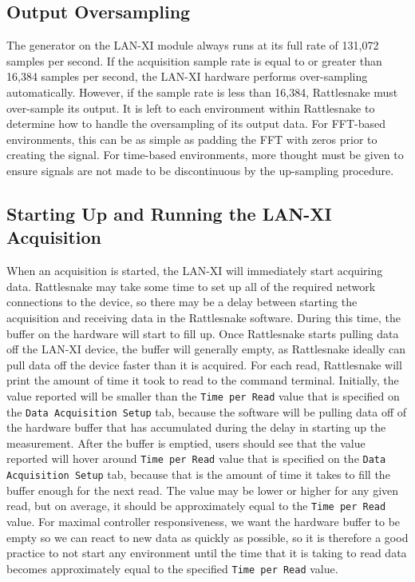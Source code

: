 \documentclass[pdf,12pt,report]{SANDreport}
\newcommand{\inlineCode}{\lstinline[basicstyle=\bfseries\ttfamily]}
\begin{document}
    \subsection{Output Oversampling}
    The generator on the LAN-XI module always runs at its full rate of 131,072 samples per second.  If the acquisition sample rate is equal to or greater than 16,384 samples per second, the LAN-XI hardware performs over-sampling automatically.  However, if the sample rate is less than 16,384, Rattlesnake must over-sample its output.  It is left to each environment within Rattlesnake to determine how to handle the oversampling of its output data.  For \ac{FFT}-based environments, this can be as simple as padding the FFT with zeros prior to creating the signal.  For time-based environments, more thought must be given to ensure signals are not made to be discontinuous by the up-sampling procedure.

    \subsection{Starting Up and Running the LAN-XI Acquisition}
    When an acquisition is started, the LAN-XI will immediately start acquiring data.  Rattlesnake may take some time to set up all of the required network connections to the device, so there may be a delay between starting the acquisition and receiving data in the Rattlesnake software.  During this time, the buffer on the hardware will start to fill up.  Once Rattlesnake starts pulling data off the LAN-XI device, the buffer will generally empty, as Rattlesnake ideally can pull data off the device faster than it is acquired.  For each read, Rattlesnake will print the amount of time it took to read to the command terminal.  Initially, the value reported will be smaller than the \inlineCode{Time per Read} value that is specified on the \inlineCode{Data Acquisition Setup} tab, because the software will be pulling data off of the hardware buffer that has accumulated during the delay in starting up the measurement.  After the buffer is emptied, users should see that the value reported will hover around \inlineCode{Time per Read} value that is specified on the \inlineCode{Data Acquisition Setup} tab, because that is the amount of time it takes to fill the buffer enough for the next read.  The value may be lower or higher for any given read, but on average, it should be approximately equal to the \inlineCode{Time per Read} value.  For maximal controller responsiveness, we want the hardware buffer to be empty so we can react to new data as quickly as possible, so it is therefore a good practice to not start any environment until the time that it is taking to read data becomes approximately equal to the specified \inlineCode{Time per Read} value.
    
\end{document}
